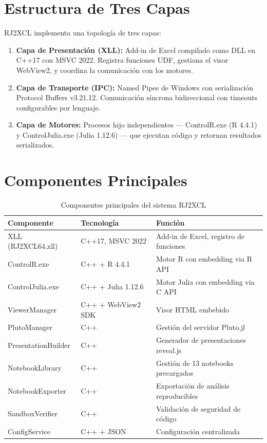\documentclass[12pt, a4paper]{report}
\begin{document}
\section{Estructura de Tres Capas}

RJ2XCL implementa una topología de tres capas:

\begin{enumerate}
    \item \textbf{Capa de Presentación (XLL):} Add-in de Excel compilado como DLL en C++17 con MSVC 2022. Registra funciones UDF, gestiona el visor WebView2, y coordina la comunicación con los motores.
    \item \textbf{Capa de Transporte (IPC):} Named Pipes de Windows con serialización Protocol Buffers v3.21.12. Comunicación síncrona bidireccional con timeouts configurables por lenguaje.
    \item \textbf{Capa de Motores:} Procesos hijo independientes --- ControlR.exe (R 4.4.1) y ControlJulia.exe (Julia 1.12.6) --- que ejecutan código y retornan resultados serializados.
\end{enumerate}

\section{Componentes Principales}

\begin{table}[h]
\centering
\begin{tabular}{lll}
\toprule
\textbf{Componente} & \textbf{Tecnología} & \textbf{Función} \\
\midrule
XLL (RJ2XCL64.xll) & C++17, MSVC 2022 & Add-in de Excel, registro de funciones \\
ControlR.exe & C++ + R 4.4.1 & Motor R con embedding via R API \\
ControlJulia.exe & C++ + Julia 1.12.6 & Motor Julia con embedding via C API \\
ViewerManager & C++ + WebView2 SDK & Visor HTML embebido \\
PlutoManager & C++ & Gestión del servidor Pluto.jl \\
PresentationBuilder & C++ & Generador de presentaciones reveal.js \\
NotebookLibrary & C++ & Gestión de 13 notebooks precargados \\
NotebookExporter & C++ & Exportación de análisis reproducibles \\
SandboxVerifier & C++ & Validación de seguridad de código \\
ConfigService & C++ + JSON & Configuración centralizada \\
\bottomrule
\end{tabular}
\caption{Componentes principales del sistema RJ2XCL}
\end{table}
\end{document}
